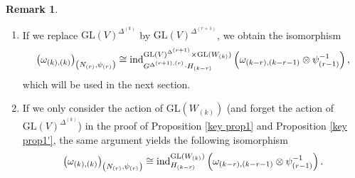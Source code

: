 \documentclass[11pt,reqno]{amsart}
\renewcommand{\1}{{\mathbf{1}}} \newcommand{\sB}{{\mathscr{B}}}
\newcommand{\GL}{{\mathrm{GL}}}\newcommand{\G}{{\mathrm{G}}}
\theoremstyle{plain}
\theoremstyle{definition}
\newtheorem{rem}[thm]{Remark} \newtheorem{fact}[thm]{Fact}
\numberwithin{equation}{section}
\begin{document}
\begin{rem}\label{rem key prop1} \begin{enumerate}
\item If we replace $\GL(V)^{\Delta^{(k)}}$ by $\GL(V)^{\Delta^{(r+1)}}$, we obtain the isomorphism $$\left(\omega_{(k),(k)}\right)_{\left(N_{(r)},\psi_{(r)}\right)}\cong\ind_{G^{\Delta^{(r+1),(r)}}\cdot H_{(k-r)}}^{\GL(V)^{\Delta^{(r+1)}}\times\GL(W_{(k)})}\left(\omega_{(k-r),(k-r-1)}\otimes\psi_{(r-1)}^{-1}\right),$$ which will be used in the next section. 
\item If we only consider the action of $\GL(W_{(k)})$ (and forget the action of $\GL(V)^{\Delta^{(k)}}$) in the proof of  Proposition \ref{key prop1}  and Proposition \ref{key prop1'}, the same argument yields the following isomorphism
$$\left(\omega_{(k),(k)}\right)_{\left(N_{(r)},\psi_{(r)}\right)}\cong\ind_{H_{(k-r)}}^{\GL(W_{(k)})}\left(\omega_{(k-r),(k-r-1)}\otimes\psi_{(r-1)}^{-1}\right).$$
\end{enumerate}
\end{rem}
\end{document}
